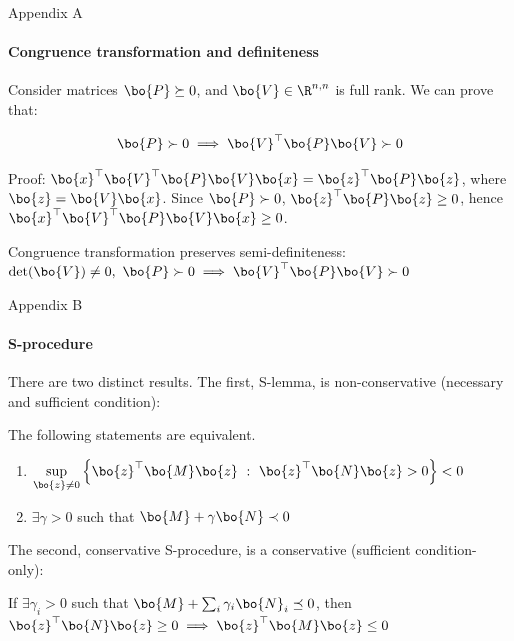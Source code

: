 \documentclass{beamer}
\begin{document}
\myqrframe



\begin{frame}{Appendix A}
	\framesubtitle{Congruence transformation and definiteness}
	\begin{flushleft}
		
		Consider matrices $\bo{P} \succeq 0$, and $\bo{V} \in \R^{n, n}$ is full rank. We can prove that:
		
		\begin{equation}
			\bo{P} \succ 0 \implies \bo{V}^\top\bo{P}\bo{V} \succ 0
		\end{equation}
		
		Proof: $\bo{x}^\top\bo{V}^\top\bo{P}\bo{V}\bo{x} = \bo{z}^\top\bo{P}\bo{z}$, where $\bo{z} = \bo{V}\bo{x}$. Since $\bo{P} \succ 0$, $\bo{z}^\top\bo{P}\bo{z} \geq 0$, hence $\bo{x}^\top\bo{V}^\top\bo{P}\bo{V}\bo{x} \geq 0$. 
		
		\begin{definition}
			Congruence transformation preserves semi-definiteness: $\text{det}(\bo{V}) \neq 0, \ \bo{P} \succ 0 \implies \bo{V}^\top\bo{P}\bo{V} \succ 0$
		\end{definition}
		
		
	\end{flushleft}
\end{frame}



\begin{frame}{Appendix B}
	\framesubtitle{S-procedure}
	\begin{flushleft}
		
There are two distinct results. The first, S-lemma, is non-conservative (necessary and sufficient condition):

\begin{theorem}[S-lemma]
	The following statements are equivalent. 
	
	\begin{enumerate}
		\item $\underset{\bo{z} \neq 0}{\text{sup}}\left\{ \bo{z}^\top \bo{M}\bo{z}  \ : \  \bo{z}^\top \bo{N}\bo{z} > 0 \right \} < 0$
		
		\item $\exists \gamma > 0$ such that $\bo{M} + \gamma \bo{N} \prec 0$
	\end{enumerate}
\end{theorem}

The second, conservative S-procedure, is a conservative (sufficient condition-only):

\begin{theorem}
	If $\exists \gamma_i > 0$ such that $\bo{M} + \sum_{i} \gamma_i \bo{N}_i \preceq 0$, then $ \bo{z}^\top \bo{N}\bo{z} \geq 0 \implies \bo{z}^\top \bo{M}\bo{z}  \leq 0$
\end{theorem}
		
		
	\end{flushleft}
\end{frame}
\end{document}
